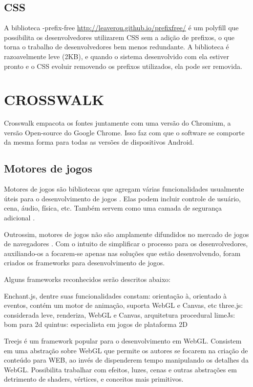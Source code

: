 \section{CSS}

A biblioteca -prefix-free \url{http://leaverou.github.io/prefixfree/}
é um polyfill que possibilita os desenvolvedores utilizarem CSS sem
a adição de prefixos, o que torna o trabalho de desenvolvedores bem
menos redundante. A biblioteca é razoavelmente leve (2KB), e quando o
sistema desenvolvido com ela estiver pronto e o CSS evoluir removendo os
prefixos utilizados, ela pode ser removida.

\chapter{CROSSWALK}

Crosswalk empacota os fontes juntamente com uma versão do Chromium, a
versão Open-source do Google Chrome. Isso faz com que o software se
comporte da mesma forma para todas as versões de dispositivos Android.

\section{Motores de jogos}

Motores de jogos são bibliotecas que agregam várias funcionalidades
usualmente úteis para o desenvolvimento de jogos \autocite[pp.
5]{browserGamesTechnologyAndFuture}. Elas podem incluir controle de
usuário, cena, áudio, física, etc. Também servem como uma camada de
segurança adicional \autocite{browserGamesTechnologyAndFuture}.

Outrossim, motores de jogos não são amplamente difundidos no mercado
de jogos de navegadores \autocite{browserGamesTechnologyAndFuture}.
Com o intuito de simplificar o processo para os desenvolvedores,
auxiliando-os a focarem-se apenas nas soluções que estão
desenvolvendo, foram criados os frameworks para desenvolvimento de
jogos. 

Alguns frameworks reconhecidos serão descritos abaixo:

Enchant.js, dentre suas funcionalidades constam: orientação à,
orientado à eventos, contém um motor de animação, suporta WebGL
e Canvas, etc three.js: considerada leve, renderiza, WebGL e Canvas,
arquitetura procedural limeJs: bom para 2d quintus: especialista em
jogos de plataforma 2D

Treejs é um framework popular para o desenvolvimento em WebGL.
Consistem em uma abstração sobre WebGL que permite os autores se
focarem na criação de conteúdo para WEB, ao invés de dispenderem
tempo manipulando os detalhes da WebGL. Possibilita trabalhar com
efeitos, luzes, cenas e outras abstrações em detrimento de shaders,
vértices, e conceitos mais primitivos.

